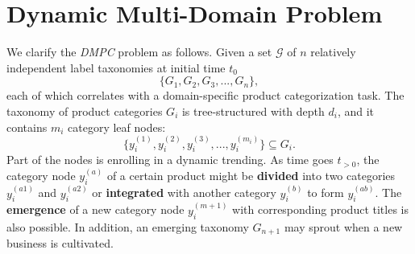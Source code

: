 \section{Dynamic Multi-Domain Problem}
We clarify the \textit{DMPC} problem as follows. Given a set $\mathcal{G}$ of $n$ relatively independent label taxonomies at initial time $t_0$
$$
\{G_1, G_2, G_3, ..., G_n\},
$$
each of which correlates with a domain-specific product categorization task. The taxonomy of product categories $G_i$ is tree-structured with depth $d_i$, and it contains $m_i$ category leaf nodes:
$$
\{y_i^{(1)}, y_i^{(2)}, y_i^{(3)}, ..., y_i^{(m_i)}\} \subseteq G_i.
$$
Part of the nodes is enrolling in a dynamic trending. As time goes $t_{>0}$, the category node $y_i^{(a)}$ of a certain product might be \textbf{divided} into two categories $y_i^{(a1)}$ and $y_i^{(a2)}$ or \textbf{integrated} with another category $y_i^{(b)}$ to form $y_i^{(ab)}$. The \textbf{emergence} of a new category node $y_i^{(m+1)}$ with corresponding product titles is also possible.
In addition, an emerging taxonomy $G_{n+1}$ may sprout when a new business is cultivated.


